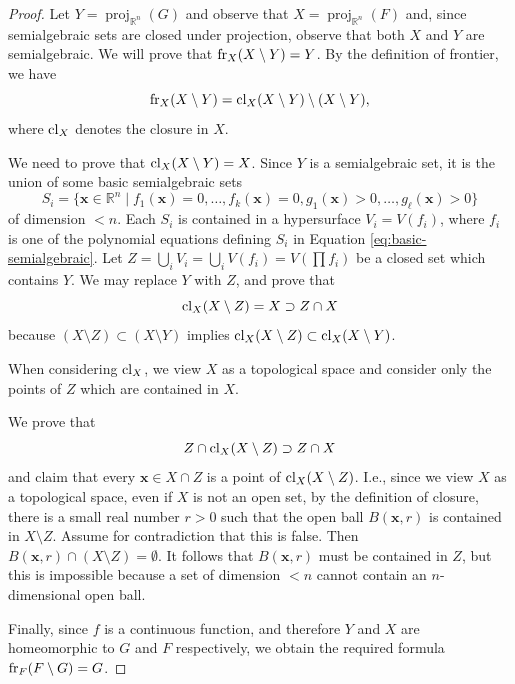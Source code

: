 \documentclass[
]{book}
\theoremstyle{definition}
\theoremstyle{definition}
\theoremstyle{definition}
\theoremstyle{definition}
\theoremstyle{remark}
\begin{document}
\begin{proof}
Let \(Y = \operatorname{proj}_{\mathbb{R}^{n}}(G)\) and observe that \(X = \operatorname{proj}_{\mathbb{R}^{n}}(F)\) and, since semialgebraic sets are closed under projection, observe that both \(X\) and \(Y\) are semialgebraic.
We will prove that \({\rm{fr}}_X(X \setminus Y) = Y\).
By the definition of frontier, we have
\[{\rm{fr}}_X(X \setminus Y)={\rm{cl}}_X(X \setminus Y) \setminus (X \setminus Y),\]
where \({\rm{cl}}_X\) denotes the closure in \(X\).

We need to prove that \({\rm{cl}}_X(X \setminus Y) = X\).
Since \(Y\) is a semialgebraic set, it is the union of some basic semialgebraic sets
\begin{equation}
S_i = \{ \mathbf{x} \in \mathbb{R}^n \mid f_1(\mathbf{x}) = 0, \ldots, f_k(\mathbf{x}) = 0, g_1(\mathbf{x}) > 0, \ldots, g_\ell(\mathbf{x}) > 0 \}
\label{eq:basic-semialgebraic}
\end{equation}
of dimension \(< n\).
Each \(S_i\) is contained in a hypersurface \(V_i = V(f_{i})\), where \(f_i\) is one of the polynomial equations defining \(S_i\) in Equation \eqref{eq:basic-semialgebraic}.
Let \(Z = \bigcup_i V_i = \bigcup_i V(f_{i}) = V(\prod f_i)\) be a closed set which contains \(Y\).
We may replace \(Y\) with \(Z\), and prove that
\[
{\rm{cl}}_X(X \setminus Z) = X \supset Z \cap X
\]
because \((X \setminus Z) \subset (X \setminus Y)\) implies \({\rm{cl}}_X(X \setminus Z) \subset {\rm{cl}}_X(X \setminus Y)\).

When considering \({\rm{cl}}_X\), we view \(X\) as a topological space and consider only the points of \(Z\) which are contained in \(X\).

We prove that
\[
Z \cap {\rm{cl}}_X(X \setminus Z) \supset Z \cap X
\]
and claim that every \(\mathbf{x} \in X \cap Z\) is a point of \({\rm{cl}}_X(X \setminus Z)\).
I.e., since we view \(X\) as a topological space, even if \(X\) is not an open set, by the definition of closure, there is a small real number \(r > 0\) such that the open ball \(B(\mathbf{x},r)\) is contained in \(X \setminus Z\).
Assume for contradiction that this is false. Then \(B(\mathbf{x}, r) \cap (X \setminus Z) = \emptyset\).
It follows that \(B(\mathbf{x},r)\) must be contained in \(Z\), but this is impossible because a set of dimension \(< n\) cannot contain an \(n\)-dimensional open ball.

Finally, since \(f\) is a continuous function, and therefore \(Y\) and \(X\) are homeomorphic to \(G\) and \(F\)
respectively, we obtain the required formula \({\rm{fr}}_{F}(F \setminus G) = G\).
\end{proof}
\end{document}
